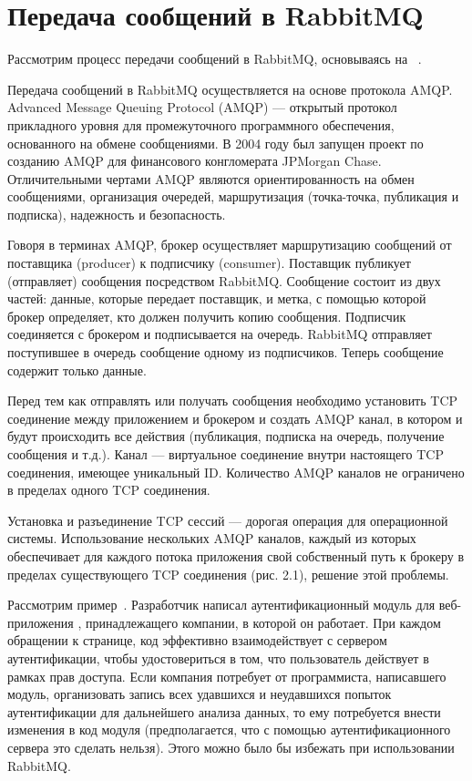 \section{Передача сообщений в RabbitMQ} 
Рассмотрим процесс передачи сообщений в RabbitMQ, основываясь на ~\cite{rabbitmq_in_action}.

Передача сообщений в RabbitMQ осуществляется на основе протокола AMQP. Advanced Message Queuing Protocol (AMQP) --- открытый протокол прикладного уровня для промежуточного программного обеспечения, основанного на обмене сообщениями. В 2004 году был запущен проект по созданию AMQP для финансового конгломерата JPMorgan Chase. Отличительными чертами AMQP являются ориентированность на обмен сообщениями, организация очередей, маршрутизация (точка-точка, публикация и подписка), надежность и безопасность.

Говоря в терминах AMQP, брокер осуществляет маршрутизацию сообщений от поставщика (producer) к подписчику (consumer). Поставщик публикует (отправляет) сообщения посредством RabbitMQ. Сообщение состоит из двух частей: данные, которые передает поставщик, и метка, с помощью которой брокер определяет, кто должен получить копию сообщения. Подписчик соединяется с брокером и подписывается на очередь. RabbitMQ отправляет поступившее в очередь сообщение одному из подписчиков. Теперь сообщение содержит только данные.

Перед тем как отправлять или получать сообщения необходимо установить TCP соединение между приложением и брокером и создать AMQP канал, в котором и будут происходить все действия (публикация, подписка на очередь, получение сообщения и т.д.). Канал --- виртуальное соединение внутри настоящего TCP соединения, имеющее уникальный ID. Количество AMQP каналов не ограничено в пределах одного TCP соединения.

Установка и разъединение TCP сессий --- дорогая операция для операционной системы. Использование нескольких AMQP каналов, каждый из которых обеспечивает  для каждого потока приложения свой собственный путь к брокеру в пределах существующего TCP соединения (рис. 2.1), решение этой проблемы.


Рассмотрим пример~\cite{rabbitmq_in_action}. Разработчик написал аутентификационный модуль для веб-приложения , принадлежащего компании, в которой он работает. При каждом обращении к странице, код эффективно взаимодействует с сервером аутентификации, чтобы удостовериться в том, что пользователь действует в рамках прав доступа. Если компания потребует от программиста, написавшего модуль, организовать запись всех удавшихся и неудавшихся попыток аутентификации для дальнейшего анализа данных, то ему потребуется внести изменения в код модуля (предполагается, что с помощью аутентификационного сервера это сделать нельзя). Этого можно было бы избежать при использовании RabbitMQ.

